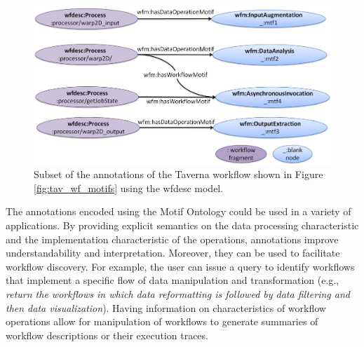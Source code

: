 \begin{figure}[ht!]
\centering
\includegraphics[scale=0.2]{Figures/tav-wf-annotated.png}
\caption{Subset of the annotations of the Taverna workflow shown in Figure \ref{fig:tav_wf_motifs} using the wfdesc model.}
\label{fig:annot-example}
\end{figure} 

The annotations encoded using the Motif Ontology could be used in a variety of applications. By providing explicit semantics on the data processing characteristic and the implementation characteristic of the operations, annotations improve understandability and interpretation. Moreover, they can be used to facilitate workflow discovery. For example, the user can issue a query to identify workflows that implement a specific flow of data manipulation and transformation (e.g., {\em return the workflows in which data reformatting is followed by data filtering and then data visualization}). Having information on characteristics of workflow operations allow for manipulation of workflows to generate summaries \cite{summaryBigData13} of workflow descriptions or their execution traces.
 
